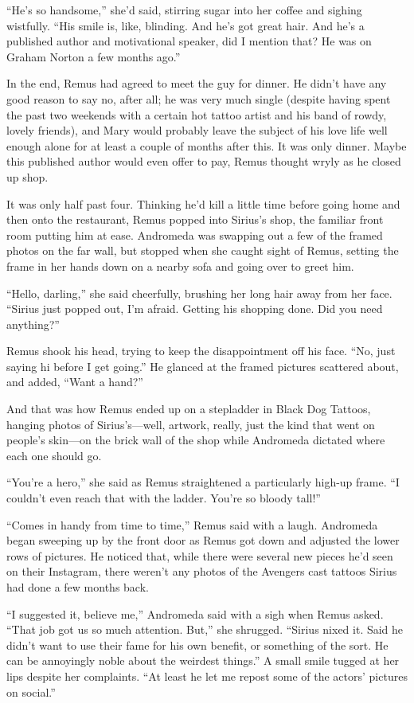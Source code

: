 “He’s so handsome,” she’d said, stirring sugar into her coffee and sighing wistfully. “His smile is, like, blinding. And he’s got great hair. And he’s a published author and motivational speaker, did I mention that? He was on Graham Norton a few months ago.”

In the end, Remus had agreed to meet the guy for dinner. He didn’t have any good reason to say no, after all; he was very much single (despite having spent the past two weekends with a certain hot tattoo artist and his band of rowdy, lovely friends), and Mary would probably leave the subject of his love life well enough alone for at least a couple of months after this. It was only dinner. Maybe this published author would even offer to pay, Remus thought wryly as he closed up shop.

It was only half past four. Thinking he’d kill a little time before going home and then onto the restaurant, Remus popped into Sirius’s shop, the familiar front room putting him at ease. Andromeda was swapping out a few of the framed photos on the far wall, but stopped when she caught sight of Remus, setting the frame in her hands down on a nearby sofa and going over to greet him.

“Hello, darling,” she said cheerfully, brushing her long hair away from her face. “Sirius just popped out, I’m afraid. Getting his shopping done. Did you need anything?”

Remus shook his head, trying to keep the disappointment off his face. “No, just saying hi before I get going.” He glanced at the framed pictures scattered about, and added, “Want a hand?”

And that was how Remus ended up on a stepladder in Black Dog Tattoos, hanging photos of Sirius’s—well, artwork, really, just the kind that went on people’s skin—on the brick wall of the shop while Andromeda dictated where each one should go.

“You’re a hero,” she said as Remus straightened a particularly high-up frame. “I couldn’t even reach that with the ladder. You’re so bloody tall!”

“Comes in handy from time to time,” Remus said with a laugh. Andromeda began sweeping up by the front door as Remus got down and adjusted the lower rows of pictures. He noticed that, while there were several new pieces he’d seen on their Instagram, there weren’t any photos of the Avengers cast tattoos Sirius had done a few months back.

“I suggested it, believe me,” Andromeda said with a sigh when Remus asked. “That job got us so much attention. But,” she shrugged. “Sirius nixed it. Said he didn’t want to use their fame for his own benefit, or something of the sort. He can be annoyingly noble about the weirdest things.” A small smile tugged at her lips despite her complaints. “At least he let me repost some of the actors’ pictures on social.”

